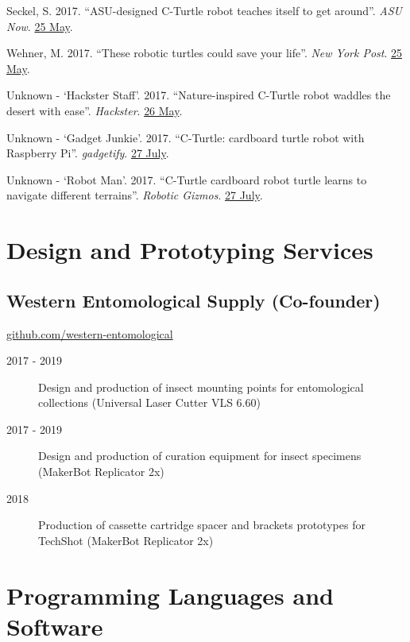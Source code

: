 \documentclass[12pt,a4paper]{article}
\begin{document}
\begin{description}
	\item Seckel, S. 2017. ``ASU-designed C-Turtle robot teaches itself to get around''. \textit{ASU Now}. \href{https://asunow.asu.edu/20170525-solutions-asu-designed-c-turtle-robot-teaches-itself-get-around}{25 May}.
	\item Wehner, M. 2017. ``These robotic turtles could save your life''. \textit{New York Post}. \href{https://nypost.com/2017/05/25/these-robotic-turtles-could-save-your-life/}{25 May}.
	\item Unknown - `Hackster Staff'. 2017. ``Nature-inspired C-Turtle robot waddles the desert with ease''. \textit{Hackster}. \href{https://blog.hackster.io/nature-inspired-c-turtle-robot-waddles-the-desert-with-ease-3061cbc19b36}{26 May}.
	\item Unknown - `Gadget Junkie'. 2017. ``C-Turtle: cardboard turtle robot with Raspberry Pi''. \textit{gadgetify}. \href{http://www.gadgetify.com/c-turtle-cardboard-turtle-robot/}{27 July}.
	\item Unknown - `Robot Man'. 2017. ``C-Turtle cardboard robot turtle learns to navigate different terrains''. \textit{Robotic Gizmos}. \href{http://www.roboticgizmos.com/c-turtle-robot-turtle/}{27 July}.
\end{description}

\section*{Design and Prototyping Services}
\subsection*{Western Entomological Supply (Co-founder)}
\href{https://github.com/western-entomological}{github.com/western-entomological}
\begin{description}
	\item [2017 - 2019] Design and production of insect mounting points for entomological collections (Universal Laser Cutter VLS 6.60)
	\item [2017 - 2019] Design and production of curation equipment for insect specimens (MakerBot Replicator 2x)
	\item [2018] Production of cassette cartridge spacer and brackets prototypes for TechShot (MakerBot Replicator 2x)
\end{description}

\section*{Programming Languages and Software}
\end{document}
